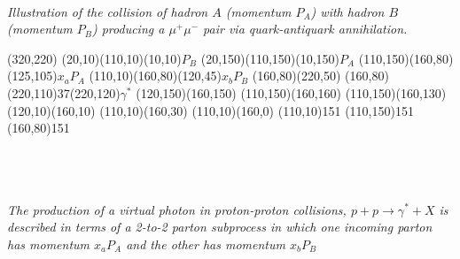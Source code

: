 \\{\sl Illustration of the collision of hadron $A$ (momentum $P_A$) with hadron $B$ (momentum $P_B$) producing a $\mu^+\mu^-$ pair via quark-antiquark annihilation.}
\\
\newline\newline
\begin{axopicture}(320,220) 	
	(20,10)(110,10)\Text(10,10){$P_B$}
	(20,150)(110,150)\Text(10,150){$P_A$}
	\Line[arrow](110,150)(160,80)\Text(125,105){$x_aP_A$}
	\Line[arrow](110,10)(160,80)\Text(120,45){$x_bP_B$}
	\Line[arrow](160,80)(220,50)
	\Photon(160,80)(220,110){3}{7}\Text(220,120){$\gamma^\ast$}
	\Line[arrow](120,150)(160,150)
	\Line[arrow](110,150)(160,160)
	\Line[arrow](110,150)(160,130)
	\Line[arrow](120,10)(160,10)
	\Line[arrow](110,10)(160,30)
	\Line[arrow](110,10)(160,0)
	\GCirc(110,10){15}{1}
	\GCirc(110,150){15}{1}
	\GCirc(160,80){15}{1}
\end{axopicture}
\\ \\ \\{\sl The production of a virtual photon in proton-proton collisions, $p+p\to\gamma^\ast+X$ is described in terms of a 2-to-2 parton subprocess in which one incoming parton has momentum $x_aP_A$ and the other has momentum $x_bP_B$}

